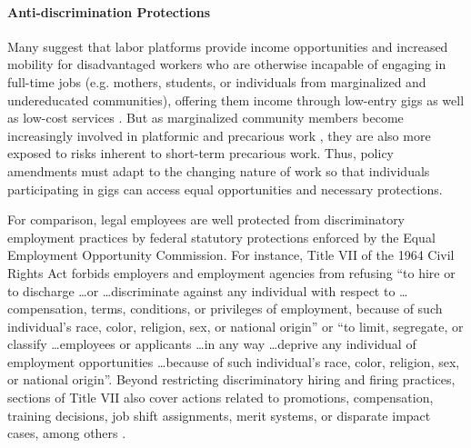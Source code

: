 \paragraph{Anti-discrimination Protections}
Many suggest that labor platforms provide income opportunities and  increased mobility for  disadvantaged workers who are otherwise incapable of engaging in full-time jobs (e.g. mothers, students, or individuals from marginalized and undereducated communities), offering them income through low-entry gigs as well as low-cost services \cite{Choudary2018-qn,moving}. But as marginalized community members become increasingly involved in platformic and precarious work \cite{Dillahunt2021-ky}, they are also more exposed to risks inherent to short-term precarious work. Thus, policy amendments must adapt to the changing nature of work so that individuals participating in gigs can access equal opportunities and necessary protections. 

For comparison, legal employees are well protected from discriminatory employment practices by federal statutory protections enforced by the Equal Employment Opportunity Commission. For instance, Title VII of the 1964 Civil Rights Act forbids employers and employment agencies from refusing ``to hire or to discharge \dots or \dots discriminate against any individual with respect to \dots compensation, terms, conditions, or privileges of employment, because of such individual's race, color, religion, sex, or national origin'' or ``to limit, segregate, or classify \dots employees or applicants \dots in any way \dots deprive any individual of employment opportunities \dots because of such individual's race, color, religion, sex, or national origin''. Beyond restricting discriminatory hiring and firing practices, sections of Title VII also cover actions related to promotions, compensation, training decisions, job shift assignments, merit systems, or disparate impact cases, among others \cite{noauthor_2019-kq}.

